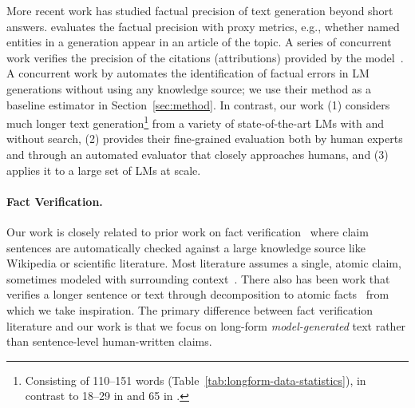 \documentclass[11pt]{article}
\newcommand{\myskip}[1]{}
\begin{document}
More recent work has studied factual precision of text generation beyond short answers. 
\citet{lee2022factuality} evaluates the factual precision with proxy metrics, e.g., whether named entities in a generation appear in an article of the topic.
A series of concurrent work verifies the precision of the citations (attributions) provided by the model~\citep{gao2022attributed,liu2023evaluating,yue2023automatic,gao2023enabling}.
A concurrent work by \citet{manakul2023selfcheckgpt} automates the identification of factual errors in LM generations without using any knowledge source; we use their method as a baseline estimator in Section~\ref{sec:method}.
In contrast, our work (1) considers much longer text generation\footnote{Consisting of 110--151 words (Table~\ref{tab:longform-data-statistics}), in contrast to 18--29 in \citet{gao2022attributed} and 65 in \citet{liu2023evaluating}.} from a variety of state-of-the-art LMs with and without search, (2) provides their fine-grained evaluation both by human experts and through an automated evaluator that closely approaches humans, and (3) applies it to a large set of LMs at scale.

\myskip{
More recent work has studied factual precision in the LM-generated text, as summarized in Table~\ref{tab:longform-related}. 
They include concurrent work from \citet{manakul2023selfcheckgpt} which proposes to validate factuality of generation without a nonparametric component, which we compare against in Section~\ref{subsec:models-validation}, and \citet{liu2023evaluating}, which evaluates veracity of citations provided by commercial generative search engines.
%
Our work is the first that (1) evaluates \textbf{\em long}-form generation from a variety of state-of-the-art base models with and without search, (2) provides fine-grained labels in precision (three-level labels that consider two different causes of precision errors, atomic-level instead of sentence-level; detailed in Section~\ref{sec:benchmark}), and (3) benchmarks a range of verification models, highlighting the importance of each component.
}


\vspace{-.3em}
\paragraph{Fact Verification.} Our work is closely related to prior work on fact verification~\citep{thorne-etal-2018-fever,wadden-etal-2020-fact} where claim sentences are automatically checked against a large knowledge source like Wikipedia or scientific literature.
Most literature assumes a single, atomic claim, sometimes modeled with surrounding context~\citep{nakov2018overview, mihaylova2019semeval, shaar-etal-2022-role}.
There also has been work that verifies a longer sentence or text through decomposition to atomic facts~\citep{fan2020generating,wright-etal-2022-generating,chen2022generating,kamoi2023wice}
from which we take inspiration.
The primary difference between fact verification literature and our work is that we focus on long-form {\em model-generated} text rather than sentence-level human-written claims.
\end{document}
